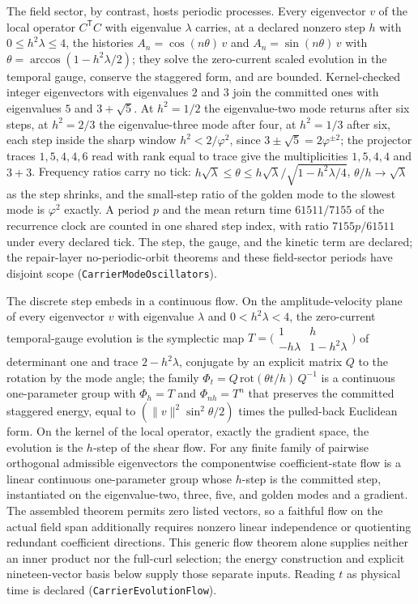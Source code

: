 \documentclass[11pt]{article}
\begin{document}
The field sector, by contrast, hosts periodic processes. Every eigenvector
\(v\) of the local operator \(C^{\mathsf T}C\) with eigenvalue \(\lambda\)
carries, at a declared nonzero step \(h\) with
\(0\le h^2\lambda\le 4\), the histories
\(A_n=\cos(n\theta)\,v\) and \(A_n=\sin(n\theta)\,v\) with
\(\theta=\arccos(1-h^2\lambda/2)\); they solve the zero-current scaled
evolution in the temporal gauge, conserve the staggered form, and are
bounded. Kernel-checked integer eigenvectors with eigenvalues \(2\) and
\(3\) join the committed ones with eigenvalues \(5\) and \(3+\sqrt5\). At
\(h^2=1/2\) the eigenvalue-two mode returns after six steps, at
\(h^2=2/3\) the eigenvalue-three mode after four, at \(h^2=1/3\) after
six, each step inside the sharp window \(h^2<2/\varphi^2\), since
\(3\pm\sqrt5=2\varphi^{\pm2}\); the projector traces \(1,5,4,4,6\) read
with rank equal to trace give the multiplicities \(1,5,4,4\) and \(3+3\).
Frequency ratios carry no tick: \(h\sqrt\lambda\le\theta\le
h\sqrt\lambda/\sqrt{1-h^2\lambda/4}\), \(\theta/h\to\sqrt\lambda\) as the
step shrinks, and the small-step ratio of the golden mode to the slowest
mode is \(\varphi^2\) exactly. A period \(p\) and the mean return time
\(61511/7155\) of the recurrence clock are counted in one shared step
index, with ratio \(7155p/61511\) under every declared tick. The step, the
gauge, and the kinetic term are declared; the repair-layer no-periodic-orbit
theorems and these field-sector periods have disjoint scope
(\texttt{CarrierModeOscillators}).

The discrete step embeds in a continuous flow. On the amplitude-velocity
plane of every eigenvector \(v\) with eigenvalue \(\lambda\) and
\(0<h^2\lambda<4\), the zero-current temporal-gauge evolution is the
symplectic map \(T=\bigl(\begin{smallmatrix}1&h\\-h\lambda&1-h^2\lambda\end{smallmatrix}\bigr)\)
of determinant one and trace \(2-h^2\lambda\), conjugate by an explicit
matrix \(Q\) to the rotation by the mode angle; the family
\(\Phi_t=Q\,\mathrm{rot}(\theta t/h)\,Q^{-1}\) is a continuous one-parameter
group with \(\Phi_h=T\) and \(\Phi_{nh}=T^n\) that preserves the committed
staggered energy, equal to \((\lVert v\rVert^2\sin^2\theta/2)\) times the
pulled-back Euclidean form. On the kernel of the local operator, exactly the
gradient space, the evolution is the \(h\)-step of the shear flow. For any
finite family of pairwise orthogonal admissible eigenvectors the
componentwise coefficient-state flow is a linear continuous one-parameter group whose
\(h\)-step is the committed step, instantiated on the eigenvalue-two,
three, five, and golden modes and a gradient. The assembled theorem permits
zero listed vectors, so a faithful flow on the actual field span additionally
requires nonzero linear independence or quotienting redundant coefficient
directions. This generic flow theorem alone supplies neither an inner product
nor the full-curl selection; the energy construction and explicit
nineteen-vector basis below supply those separate inputs. Reading \(t\) as
physical time is declared
(\texttt{CarrierEvolutionFlow}).
\end{document}

